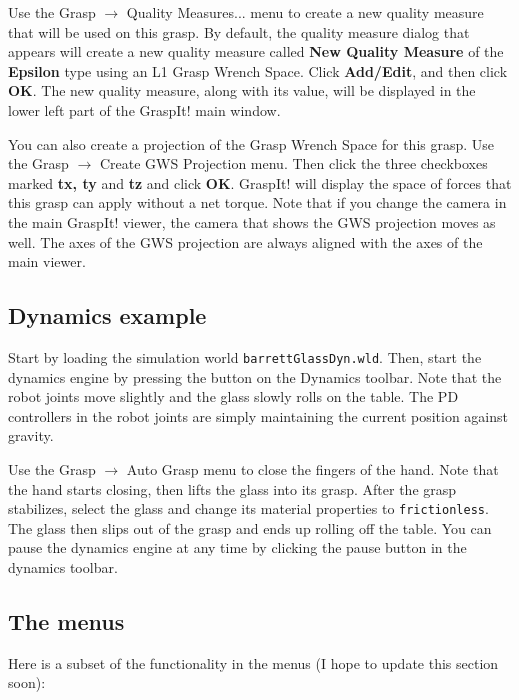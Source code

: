 Use the Grasp $\rightarrow$ Quality Measures... menu to create a new quality
measure that will be used on this grasp. By default, the quality
measure dialog that appears will create a new quality measure called
\textbf{New Quality Measure} of the \textbf{Epsilon} type using an L1
Grasp Wrench Space. Click \textbf{Add/Edit}, and then click
\textbf{OK}. The new quality measure, along with its value, will be
displayed in the lower left part of the GraspIt! main window.

You can also create a projection of the Grasp Wrench Space for this
grasp. Use the Grasp $\rightarrow$ Create GWS Projection menu. Then click the
three checkboxes marked \textbf{tx, ty} and \textbf{tz} and click
\textbf{OK}. GraspIt! will display the space of forces that this grasp
can apply without a net torque. Note that if you change the camera in
the main GraspIt! viewer, the camera that shows the GWS projection
moves as well. The axes of the GWS projection are always aligned with
the axes of the main viewer.

\subsection{Dynamics example}

Start by loading the simulation world
\texttt{barrettGlassDyn.wld}. Then, start the dynamics engine by
pressing the  button on the Dynamics toolbar. Note
that the robot joints move slightly and the glass slowly rolls on the
table. The PD controllers in the robot joints are simply maintaining
the current position against gravity.

Use the Grasp $\rightarrow$ Auto Grasp menu to close the fingers of the
hand. Note that the hand starts closing, then lifts the glass into its
grasp. After the grasp stabilizes, select the glass and change its
material properties to \texttt{frictionless}. The glass then slips out
of the grasp and ends up rolling off the table. You can pause the
dynamics engine at any time by clicking the pause button in the
dynamics toolbar.

\subsection{The menus}

Here is a subset of the functionality in the menus (I hope to update
this section soon):

